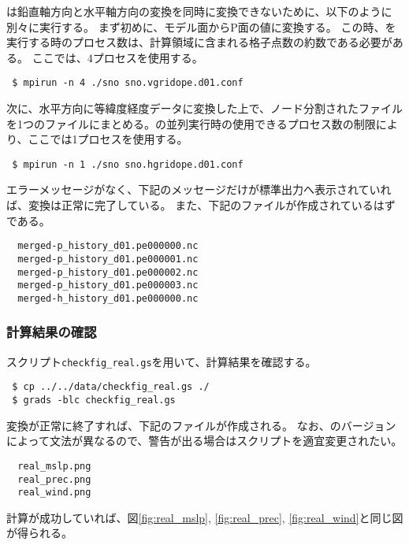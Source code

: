 \sno は鉛直軸方向と水平軸方向の変換を同時に変換できないために、以下のように別々に実行する。
まず初めに、モデル面からP面の値に変換する。
この時、\sno を実行する時のプロセス数は、計算領域に含まれる格子点数の約数である必要がある。
ここでは、4プロセスを使用する。
\begin{verbatim}
 $ mpirun -n 4 ./sno sno.vgridope.d01.conf
\end{verbatim}
次に、水平方向に等緯度経度データに変換した上で、ノード分割された{\netcdf}ファイルを1つのファイルにまとめる。\sno の並列実行時の使用できるプロセス数の制限により、ここでは1プロセスを使用する。
\begin{verbatim}
 $ mpirun -n 1 ./sno sno.hgridope.d01.conf
\end{verbatim}
エラーメッセージがなく、下記のメッセージだけが標準出力へ表示されていれば、変換は正常に完了している。
また、下記のファイルが作成されているはずである。
\begin{verbatim}
  merged-p_history_d01.pe000000.nc
  merged-p_history_d01.pe000001.nc
  merged-p_history_d01.pe000002.nc
  merged-p_history_d01.pe000003.nc
  merged-h_history_d01.pe000000.nc
\end{verbatim}

\subsubsection{計算結果の確認}


\grads スクリプト\verb|checkfig_real.gs|を用いて、計算結果を確認する。
\begin{verbatim}
 $ cp ../../data/checkfig_real.gs ./
 $ grads -blc checkfig_real.gs
\end{verbatim}
変換が正常に終了すれば、下記のファイルが作成される。
なお、\grads のバージョンによって文法が異なるので、警告が出る場合はスクリプトを適宜変更されたい。
\begin{verbatim}
  real_mslp.png
  real_prec.png
  real_wind.png
\end{verbatim}
計算が成功していれば、図\ref{fig:real_mslp}, \ref{fig:real_prec}, \ref{fig:real_wind}と同じ図が得られる。


